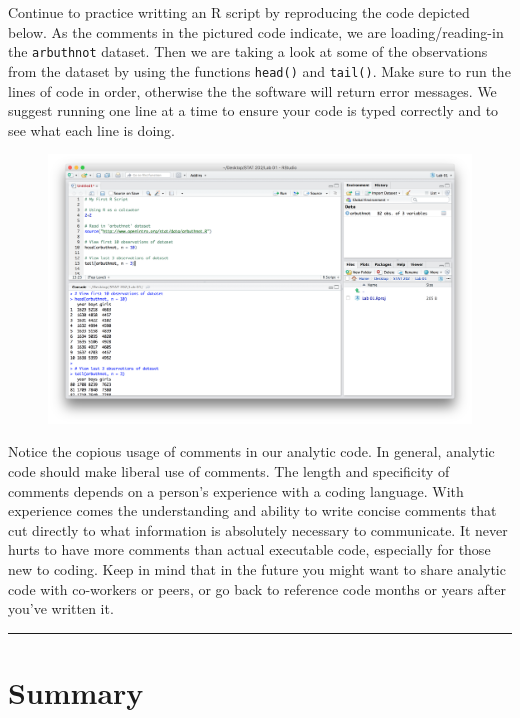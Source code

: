 \documentclass[]{book}
\theoremstyle{definition}
\theoremstyle{definition}
\theoremstyle{definition}
\theoremstyle{remark}
\begin{document}
Continue to practice writting an R script by reproducing the code
depicted below. As the comments in the pictured code indicate, we are
loading/reading-in the \texttt{arbuthnot} dataset. Then we are taking a
look at some of the observations from the dataset by using the functions
\texttt{head()} and \texttt{tail()}. Make sure to run the lines of code
in order, otherwise the the software will return error messages. We
suggest running one line at a time to ensure your code is typed
correctly and to see what each line is doing.

\begin{figure}[htbp]
\centering
\includegraphics{./assets/images/01-08.png}
\caption{}
\end{figure}

Notice the copious usage of comments in our analytic code. In general,
analytic code should make liberal use of comments. The length and
specificity of comments depends on a person's experience with a coding
language. With experience comes the understanding and ability to write
concise comments that cut directly to what information is absolutely
necessary to communicate. It never hurts to have more comments than
actual executable code, especially for those new to coding. Keep in mind
that in the future you might want to share analytic code with co-workers
or peers, or go back to reference code months or years after you've
written it.

\begin{center}\rule{0.5\linewidth}{\linethickness}\end{center}

\section{Summary}\label{summary}
\end{document}
